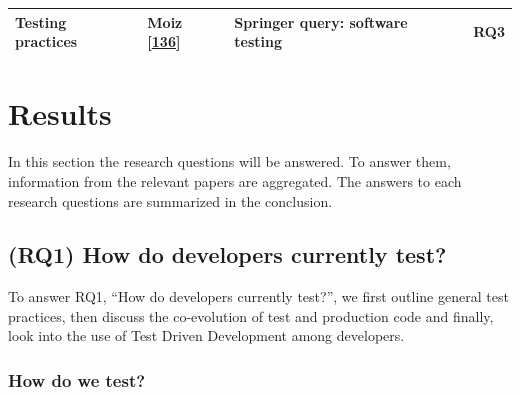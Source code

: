 \documentclass[]{book}
\begin{document}
\begin{longtable}[]{@{}llll@{}}
\begin{minipage}[t]{0.18\columnwidth}\raggedright\strut
Testing practices\strut
\end{minipage} & \begin{minipage}[t]{0.16\columnwidth}\raggedright\strut
Moiz {[}\protect\hyperlink{ref-moiz2017uncertainty}{136}{]}\strut
\end{minipage} & \begin{minipage}[t]{0.50\columnwidth}\raggedright\strut
Springer query: software testing\strut
\end{minipage} & \begin{minipage}[t]{0.04\columnwidth}\raggedright\strut
RQ3\strut
\end{minipage}\tabularnewline
\bottomrule
\end{longtable}

\section{Results}\label{results}

In this section the research questions will be answered. To answer them,
information from the relevant papers are aggregated. The answers to each
research questions are summarized in the conclusion.

\subsection{(RQ1) How do developers currently
test?}\label{rq1-how-do-developers-currently-test}

To answer RQ1, ``How do developers currently test?'', we first outline
general test practices, then discuss the co-evolution of test and
production code and finally, look into the use of Test Driven
Development among developers.

\subsubsection{How do we test?}\label{how-do-we-test}
\end{document}
